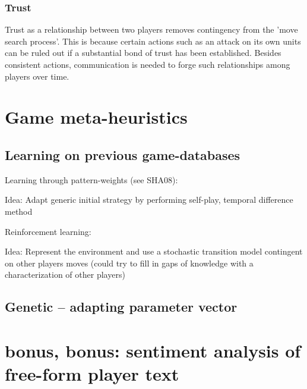 \documentclass[12pt]{article}
\begin{document}
\subsubsection{Trust}

Trust as a relationship between two players removes contingency
from the 'move search process'. This is because certain actions such
as an attack on its own units can be ruled out if a substantial bond of trust
has been established. Besides consistent actions, communication
is needed to forge such relationships among players over time. 

\section{Game meta-heuristics}

\subsection{Learning on previous game-databases}

Learning through pattern-weights (see SHA08):

  Idea: Adapt generic initial strategy by performing 
        self-play, temporal difference method

Reinforcement learning:

  Idea: Represent the environment and use a stochastic
        transition model contingent on other players
        moves (could try to fill in gaps of knowledge 
        with a characterization of other players)

  

\subsection{Genetic -- adapting parameter vector}

\section{bonus, bonus: sentiment analysis of free-form player text}
\end{document}
